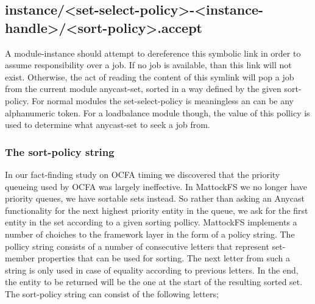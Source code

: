 \subsection{instance/<set-select-policy>-<instance-handle>/<sort-policy>.accept}
A module-instance should attempt to dereference this symbolic link in order to assume responsibility over a job. If no job is available, than this link will not exist. Otherwise, the act of reading the content of this symlink will pop a job from the current module anycast-set, sorted in a way defined by the given sort-policy. For normal modules the set-select-policy is meaningless an can be any alphanumeric token. For a loadbalance module though, the value of this pollicy is used to determine what anycast-set to seek a job from.
\subsubsection{The sort-policy string}
In our fact-finding study on OCFA timing we discovered that the priority queueing used by OCFA was largely ineffective. In MattockFS we no longer have priority queues, we have sortable sets instead. So rather than asking an Anycast functionality for the next highest priority entity in the queue, we ask for the first entity in the set according to a given sorting pollicy. MattockFS implements a number of choiches to the framework layer in the form of a policy string. The pollicy string consists of a number of consecutive letters that represent set-member properties that can be used for sorting. The next letter from such a string is only used in case of equality according to previous letters. In the end, the entity to be returned will be the one at the start of the resulting sorted set. The sort-policy string can consist of the following letters;
